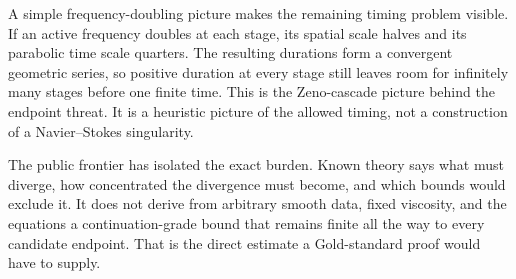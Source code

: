 A simple frequency-doubling picture makes the remaining timing problem visible.
If an active frequency doubles at each stage, its spatial scale halves and its parabolic time scale quarters.
The resulting durations form a convergent geometric series, so positive duration at every stage still leaves room for infinitely many stages before one finite time.
This is the Zeno-cascade picture behind the endpoint threat.
It is a heuristic picture of the allowed timing, not a construction of a Navier--Stokes singularity.

The public frontier has isolated the exact burden.
Known theory says what must diverge, how concentrated the divergence must become, and which bounds would exclude it.
It does not derive from arbitrary smooth data, fixed viscosity, and the equations a continuation-grade bound that remains finite all the way to every candidate endpoint.
That is the direct estimate a Gold-standard proof would have to supply.

